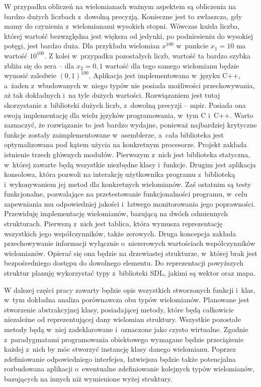 W przypadku obliczeń na wielomianach ważnym aspektem są obliczenia na bardzo dużych liczbach z~dowolną precyzją. Konieczne jest to zwłaszcza, gdy mamy do czynienia z~wielomianami wysokich stopni. Wówczas każda liczba, której wartość bezwzględna jest większa od jedynki, po podniesieniu do wysokiej potęgi, jest bardzo duża. Dla przykładu wielomian $x^{100}$ w~punkcie $x_1=10$ ma wartość $10^{100}$. Z kolei w~przypadku pozostałych liczb, wartość ta bardzo szybka zbliża się do zera – dla $x_2=0,1$ wartość dla tego samego wielomianu będzie wynosić zaledwie $(0,1)^{100}$. Aplikacja jest implementowana w~języku C++, a~żaden z~wbudowanych w~niego typów nie posiada możliwości przechowywania, aż tak dokładnych i~na tyle dużych wartości. Rozwiązaniem jest tutaj skorzystanie z~biblioteki dużych liczb, z~dowolną precyzji – mpir. Posiada ona swoją implementację dla wielu języków programowania, w~tym C i~C++.  Warto zaznaczyć, że rozwiązanie to jest bardzo wydajne, ponieważ najbardziej krytyczne funkcje zostały zaimplementowane w~asemblerze, a~cała biblioteka jest optymalizowana pod kątem użycia na konkretnym procesorze.
Projekt zakłada istnienie trzech głównych modułów. Pierwszym z~nich jest biblioteka statyczna, w~której zawarte będą wszystkie niezbędne klasy i~funkcje. Drugim jest aplikacja konsolowa, która pozwoli na interakcję użytkownika programu z~biblioteką i~wykonywaniem jej metod dla konkretnych wielomianów. Zaś ostatnim są testy funkcjonalne, pozwalające na przetestowanie funkcjonalności programu, w~celu zapewniania mu odpowiedniej jakości i~łatwego monitorowania jego poprawności.
Przewiduję implementację wielomianów, bazującą na dwóch odmiennych strukturach. Pierwszą z~nich jest tablica, która wymusza reprezentację wszystkich jego współczynników, także zerowych. Druga koncepcja zakłada przechowywanie informacji wyłącznie o~niezerowych wartościach  współczynników wielomianów. Opierać się ona będzie na drzewiastej strukturze, w~której brak jest bezpośredniego dostępu do dowolnego elementu. Do reprezentacji powyższych struktur planuję wykorzystać typy z~biblioteki SDL, jakimi są wektor oraz mapa.

W dalszej części pracy zawarty będzie opis wszystkich stworzonych funkcji i~klas, w~tym dokładna analiza porównawcza obu typów wielomianów. Planowane jest stworzenie abstrakcyjnej klasy, posiadającej metody, które będą całkowicie niezależne od reprezentującej dany wielomian struktury. Wszystkie pozostałe metody będą w~niej zadeklarowane i~oznaczone jako czysto wirtualne. Zgodnie z~paradygmatami programowania obiektowego wymagane będzie przeciążenie każdej z~nich by móc stworzyć instancję klasy danego wielomianu. Poprzez zdefiniowanie odpowiedniego interfejsu, łatwiejsza będzie także potencjalna rozbudowana aplikacji o~ewentualne zdefiniowanie kolejnych typów wielomianów, bazujących na innych niż wymienione wyżej struktury.

